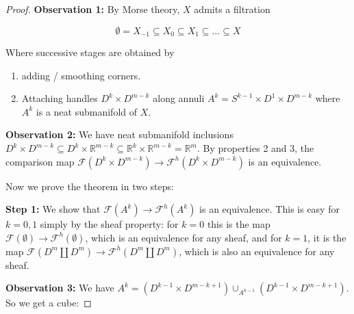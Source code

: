\documentclass{article}
\newtheorem{proposed work}[theorem]{Proposed Work}
\begin{document}
\begin{proof}

\textbf{Observation 1:} By Morse theory, $X$ admits a filtration

\[ \emptyset  = X_{-1} \subseteq X_0 \subseteq X_1 \subseteq \dots \subseteq X \]

Where successive stages are obtained by

\begin{enumerate}
\item adding / smoothing corners.
\item Attaching handles $D^k \times D^{m-k}$ along annuli $A^k = S^{k-1} \times D^1 \times D^{m-k}$ where $A^k$ is a neat submanifold of $X$.
\end{enumerate}

\textbf{Observation 2:} We have neat submanifold inclusions $D^k \times D^{m-k} \subseteq D^k \times \mathbb R^{m-k} \subseteq \mathbb R^k \times \mathbb R^{m-k} = \mathbb R^m$. By properties 2 and 3, the comparison map $\mathcal F(D^k \times D^{m-k}) \to \mathcal F^h(D^k \times D^{m-k})$ is an equivalence.

Now we prove the theorem in two steps:

\textbf{Step 1:} We show that $\mathcal F(A^k) \to \mathcal F^h(A^k)$ is an equivalence. This is easy for $k=0,1$ simply by the sheaf property: for $k=0$ this is the map $\mathcal F(\emptyset) \to \mathcal F^h(\emptyset)$, which is an equivalence for any sheaf, and for $k=1$, it is the map $\mathcal F(D^m \amalg D^m) \to \mathcal F^h(D^m \amalg D^m)$, which is also an equivalence for any sheaf.

\textbf{Observation 3:} We have $A^k = (D^{k-1} \times D^{m-k+1}) \cup_{A^{k-1}} (D^{k-1} \times D^{m-k+1})$. So we get a cube:



\end{proof}
\end{document}
